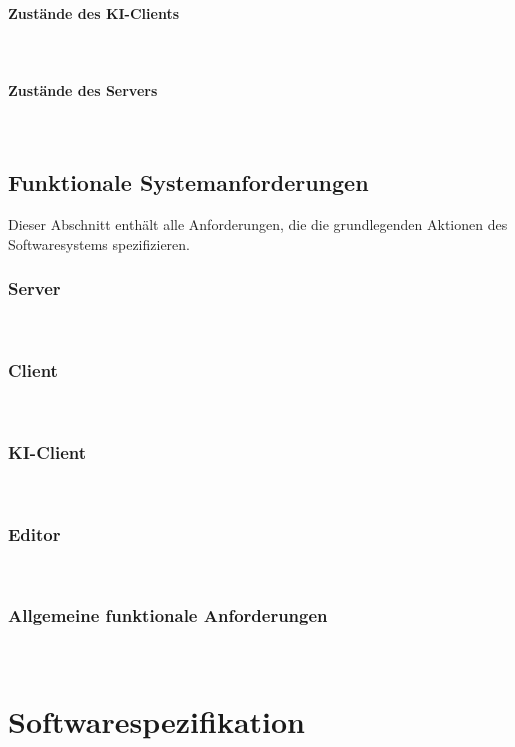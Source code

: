 \documentclass{uulm-assignment}
\begin{document}
\paragraph{Zustände des KI-Clients} \mbox{}\\

\clearpage
\paragraph{Zustände des Servers} \mbox{}\\


\clearpage
\subsection{Funktionale Systemanforderungen}
Dieser Abschnitt enthält alle Anforderungen, die die grundlegenden Aktionen des Softwaresystems spezifizieren.
\subsubsection{Server} \mbox{}\\

\newpage
\subsubsection{Client} \mbox{}\\

\subsubsection{KI-Client} \mbox{}\\

\subsubsection{Editor} \mbox{}\\

\newpage
\subsubsection{Allgemeine funktionale Anforderungen} \mbox{}\\


\clearpage
\section{Softwarespezifikation}
\end{document}

